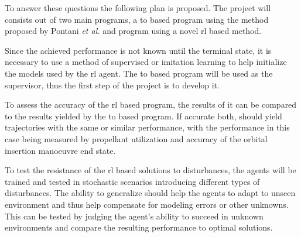To answer these questions the following plan is proposed. The project will consists out of two main programs, a \acrfull{to} based program using the method proposed by Pontani \emph{et al.} \cite{PONTANI2014852, pontani2013ascent, pontani2014simple, pontani2014optimal} and program using a novel \acrshort{rl} based method.

Since the achieved performance is not known until the terminal state, it is necessary to use a method of supervised or imitation learning to help initialize the models used by the \acrshort{rl} agent. The \acrfull{to} based program will be used as the supervisor, thus the first step of the project is to develop it. 

To assess the accuracy of the \acrshort{rl} based program, the results of it can be compared to the results yielded by the \acrshort{to} based program. If accurate both, should yield trajectories with the same or similar performance, with the performance in this case being measured by propellant utilization and accuracy of the orbital insertion manoeuvre end state.

To test the resistance of the \acrshort{rl} based solutions to disturbances, the agents will be trained and tested in stochastic scenarios introducing different types of disturbances. The ability to generalize should help the agents to adapt to unseen environment and thus help compensate for modeling errors or other unknowns. This can be tested by judging the agent's ability to succeed in unknown environments and compare the resulting performance to optimal solutions.
